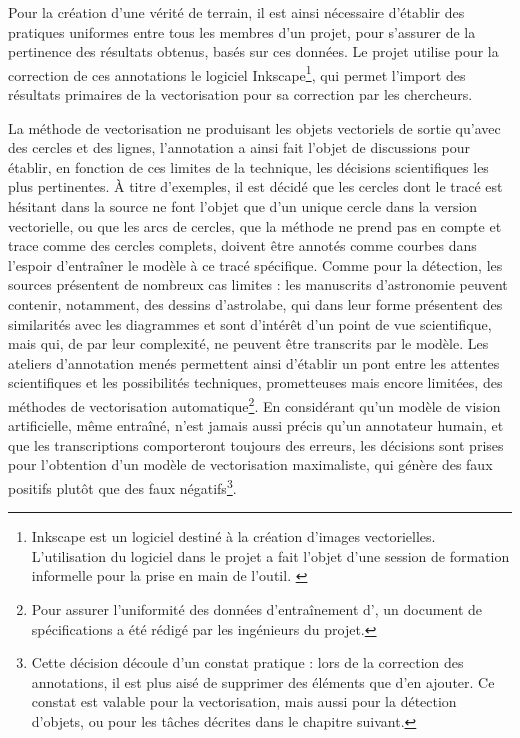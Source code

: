 	Pour la création d'une vérité de terrain, il est ainsi nécessaire d'établir des pratiques uniformes entre tous les membres d'un projet, pour s'assurer de la pertinence des résultats obtenus, basés sur ces données. Le projet \eida utilise pour la correction de ces annotations le logiciel Inkscape\footnote{Inkscape est un logiciel destiné à la création d'images vectorielles. L'utilisation du logiciel dans le projet \eida a fait l'objet d'une session de formation informelle pour la prise en main de l'outil. \cite{Inkscape}}, qui permet l'import des résultats primaires de la vectorisation pour sa correction par les chercheurs. 
	
	La méthode de vectorisation ne produisant les objets vectoriels de sortie qu'avec des cercles et des lignes, l'annotation a ainsi fait l'objet de discussions pour établir, en fonction de ces limites de la technique, les décisions scientifiques les plus pertinentes. À titre d'exemples, il est décidé que les cercles dont le tracé est hésitant dans la source ne font l'objet que d'un unique cercle dans la version vectorielle, ou que les arcs de cercles, que la méthode ne prend pas en compte et trace comme des cercles complets, doivent être annotés comme courbes dans l'espoir d'entraîner le modèle à ce tracé spécifique. Comme pour la détection, les sources présentent de nombreux cas limites : les manuscrits d'astronomie peuvent contenir, notamment, des dessins d'astrolabe, qui dans leur forme présentent des similarités avec les diagrammes et sont d'intérêt d'un point de vue scientifique, mais qui, de par leur complexité, ne peuvent être transcrits par le modèle. Les ateliers d'annotation menés permettent ainsi d'établir un pont entre les attentes scientifiques et les possibilités techniques, prometteuses mais encore limitées, des méthodes de vectorisation automatique\footnote{Pour assurer l'uniformité des données d'entraînement d'\eida, un document de spécifications a été rédigé par les ingénieurs du projet.}. En considérant qu'un modèle de vision artificielle, même entraîné, n'est jamais aussi précis qu'un annotateur humain, et que les transcriptions comporteront toujours des erreurs, les décisions sont prises pour l'obtention d'un modèle de vectorisation maximaliste, qui génère des faux positifs plutôt que des faux négatifs\footnote{Cette décision découle d'un constat pratique : lors de la correction des annotations, il est plus aisé de supprimer des éléments que d'en ajouter. Ce constat est valable pour la vectorisation, mais aussi pour la détection d'objets, ou pour les tâches décrites dans le chapitre suivant.}.


